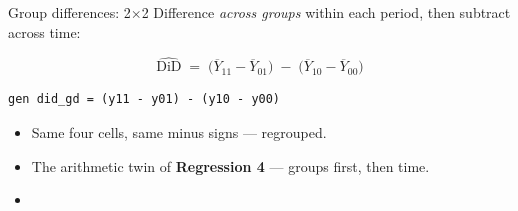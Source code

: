 \documentclass[aspectratio=169,11pt]{beamer}
\begin{document}
\begin{frame}[fragile]{Group differences: 2$\times$2}
\vspace{0.5em}
Difference \textit{across groups} within each period, then subtract across time:
\vspace{0.3em}
\begin{center}
\Large
\[
\widehat{\text{DiD}} \;=\; \big(\overline{Y}_{11} - \overline{Y}_{01}\big) \;-\; \big(\overline{Y}_{10} - \overline{Y}_{00}\big)
\]
\end{center}
\vspace{0.3em}
\begin{lstlisting}[language={[ANSI]C}]
gen did_gd = (y11 - y01) - (y10 - y00)
\end{lstlisting}
\vspace{0.2em}
\begin{itemize}\small
  \item Same four cells, same minus signs --- regrouped.
  \item The arithmetic twin of \textbf{Regression 4} --- groups first, then time.
  \item {}
\end{itemize}
\end{frame}
\end{document}
